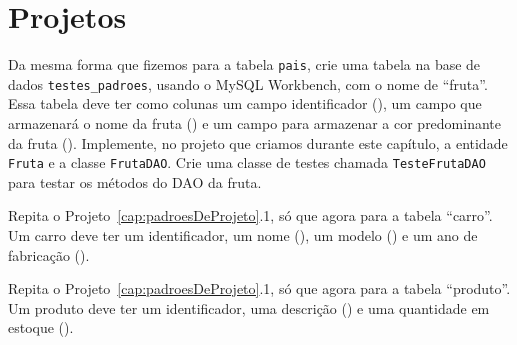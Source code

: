 \section{Projetos}

\begin{projetoSemArquivo}{}{}{}
    Da mesma forma que fizemos para a tabela \texttt{pais}, crie uma tabela na base de dados \texttt{testes\_padroes}, usando o MySQL Workbench, com o nome de ``fruta''. Essa tabela deve ter como colunas um campo identificador (), um campo que armazenará o nome da fruta () e um campo para armazenar a cor predominante da fruta (). Implemente, no projeto que criamos durante este capítulo, a entidade \texttt{Fruta} e a classe \texttt{FrutaDAO}. Crie uma classe de testes chamada \texttt{TesteFrutaDAO} para testar os métodos do DAO da fruta. 
\end{projetoSemArquivo}

\begin{projetoSemArquivo}{}{}{}
    Repita o Projeto~\ref{cap:padroesDeProjeto}.1, só que agora para a tabela ``carro''. Um carro deve ter um identificador, um nome (), um modelo () e um ano de fabricação ().
\end{projetoSemArquivo}

\begin{projetoSemArquivo}{}{}{}
    Repita o Projeto~\ref{cap:padroesDeProjeto}.1, só que agora para a tabela ``produto''. Um produto deve ter um identificador, uma descrição () e uma quantidade em estoque ().
\end{projetoSemArquivo}


